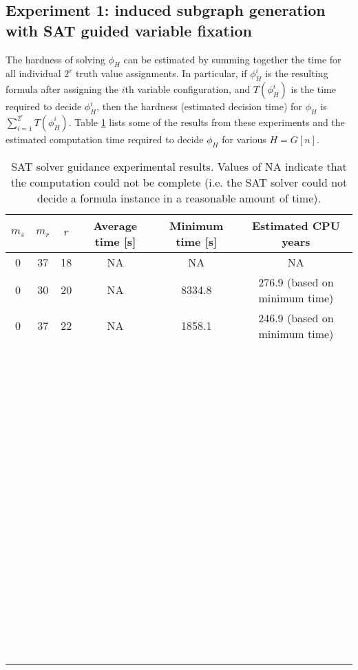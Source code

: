 \documentclass[paper=a4, fontsize=11pt]{scrartcl} %
\begin{document}
\subsection{Experiment 1: induced subgraph generation with SAT guided variable fixation}
The hardness of solving $\phi_H$ can be estimated by summing together the time for
all individual $2^r$ truth value assignments. In particular, if $\phi_H^i$ is the
resulting formula after assigning the $i$th variable configuration, and $T(\phi_H^i)$ 
is the time required to decide $\phi_H^i$, then the hardness (estimated decision time)
for $\phi_H$ is $\sum_{i = 1}^{2^r} T(\phi_H^i)$. Table \ref{tab:guidanceExperiment}
lists some of the results from these experiments and the estimated computation time
required to decide $\phi_H$ for various $H = G[n]$.

\begin{table}
	\caption{SAT solver guidance experimental results. Values of NA indicate that the computation
	could not be complete (i.e. the SAT solver could not decide a formula instance in a reasonable
	amount of time).}
	\begin{tabular}{c | c | c | c | c | c}
		\hline
		$m_s$ & $m_r$ & $r$ & Average time [s] & Minimum time [s] & Estimated CPU years\\ \hline
		0 & 37 & 18 & NA & NA & NA\\ \hline
		0 & 30 & 20 & NA & 8334.8 & 276.9 (based on minimum time) \\ \hline
		0 & 37 & 22 & NA & 1858.1 & 246.9 (based on minimum time) \\ \hline
		~ & ~ & ~ & ~ & ~ & ~ \\ \hline
		~ & ~ & ~ & ~ & ~ & ~ \\ \hline
		~ & ~ & ~ & ~ & ~ & ~ \\ \hline
		~ & ~ & ~ & ~ & ~ & ~ \\ \hline
		~ & ~ & ~ & ~ & ~ & ~ \\ \hline
		~ & ~ & ~ & ~ & ~ & ~ \\ \hline
		~ & ~ & ~ & ~ & ~ & ~ \\ \hline
		~ & ~ & ~ & ~ & ~ & ~ \\ \hline
		~ & ~ & ~ & ~ & ~ & ~ \\ \hline
		~ & ~ & ~ & ~ & ~ & ~ \\ \hline
		~ & ~ & ~ & ~ & ~ & ~ \\ \hline
		~ & ~ & ~ & ~ & ~ & ~ \\ \hline
		~ & ~ & ~ & ~ & ~ & ~ \\ \hline
		~ & ~ & ~ & ~ & ~ & ~ \\ \hline
		~ & ~ & ~ & ~ & ~ & ~ \\ \hline
		~ & ~ & ~ & ~ & ~ & ~ \\ 
		\hline
	\end{tabular}
	\label{tab:guidanceExperiment}
\end{table}
\end{document}
